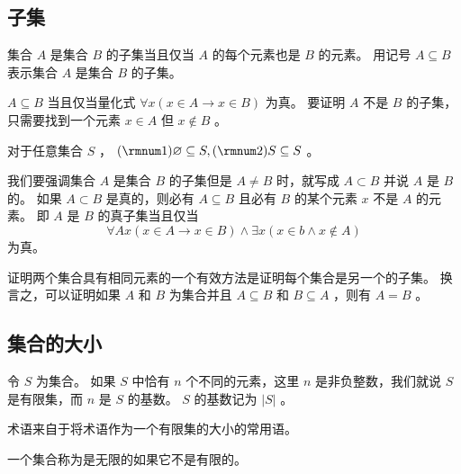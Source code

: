 {    \subsection{子集}
    {
        \begin{defines}
            集合 $A$ 是集合 $B$ 的子集当且仅当 $A$ 的每个元素也是 $B$ 的元素。
            用记号 $A \subseteq B$ 表示集合 $A$ 是集合 $B$ 的子集。

            $A \subseteq B$ 当且仅当量化式 $\forall x (x \in A \rightarrow x \in B)$ 为真。
            要证明 $A$ 不是 $B$ 的子集，只需要找到一个元素 $x \in A$ 但 $x \notin B$ 。
        \end{defines}

        \begin{defines}
            对于任意集合 $S$ ， $(\rmnum 1) \varnothing \subseteq S, (\rmnum 2) S \subseteq S$ 。
        \end{defines}

        我们要强调集合 $A$ 是集合 $B$ 的子集但是 $A \neq B$ 时，就写成 $A \subset B$ 并说 $A$ 是 $B$ 的。
        如果 $A \subset B$ 是真的，则必有 $A \subseteq B$ 且必有 $B$ 的某个元素 $x$ 不是 $A$ 的元素。
        即 $A$ 是 $B$ 的真子集当且仅当
        $$\forall A x (x \in A \rightarrow x \in B) \wedge \exists x (x \in b \wedge x \notin A)$$
        为真。

        {
            证明两个集合具有相同元素的一个有效方法是证明每个集合是另一个的子集。
            换言之，可以证明如果 $A$ 和 $B$ 为集合并且 $A \subseteq B$ 和 $B \subseteq A$ ，则有 $A = B$ 。
        }
    }

    \subsection{集合的大小}
    {
        \begin{defines}
            令 $S$ 为集合。
            如果 $S$ 中恰有 $n$ 个不同的元素，这里 $n$ 是非负整数，我们就说 $S$ 是有限集，而 $n$ 是 $S$ 的基数。
            $S$ 的基数记为 $|S|$ 。
        \end{defines}

        \begin{defines}
            术语来自于将术语作为一个有限集的大小的常用语。
        \end{defines}

        \begin{defines}
            一个集合称为是无限的如果它不是有限的。
        \end{defines}
    }

}
